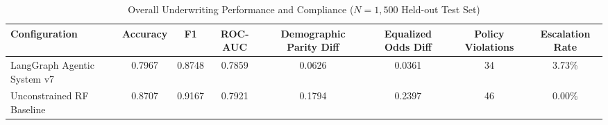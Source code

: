\begin{table}[htbp]
\centering
\caption{Overall Underwriting Performance and Compliance ($N=1,500$ Held-out Test Set)}
\label{tab:overall_perf}
\begin{tabular}{lccccccc}
\hline
Configuration & Accuracy & F1 & ROC-AUC & Demographic Parity Diff & Equalized Odds Diff & Policy Violations & Escalation Rate \\
\hline
LangGraph Agentic System v7 & 0.7967 & 0.8748 & 0.7859 & 0.0626 & 0.0361 & 34 & 3.73\% \\
Unconstrained RF Baseline & 0.8707 & 0.9167 & 0.7921 & 0.1794 & 0.2397 & 46 & 0.00\% \\
\hline
\end{tabular}
\end{table}
